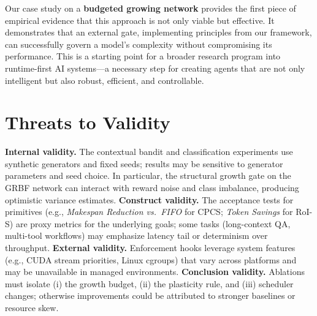 \documentclass[
]{article}
\begin{document}
Our case study on a \textbf{budgeted growing network} provides the first
piece of empirical evidence that this approach is not only viable but
effective. It demonstrates that an external gate, implementing
principles from our framework, can successfully govern a model's
complexity without compromising its performance. This is a starting
point for a broader research program into runtime-first AI systems---a
necessary step for creating agents that are not only intelligent but
also robust, efficient, and controllable.


\section*{Threats to Validity}
\textbf{Internal validity.} The contextual bandit and classification experiments use synthetic generators and fixed seeds; results may be sensitive to generator parameters and seed choice. In particular, the structural growth gate on the GRBF network can interact with reward noise and class imbalance, producing optimistic variance estimates. \textbf{Construct validity.} The acceptance tests for primitives (e.g., \emph{Makespan Reduction vs.\ FIFO} for CPCS; \emph{Token Savings} for RoI-S) are proxy metrics for the underlying goals; some tasks (long-context QA, multi-tool workflows) may emphasize latency tail or determinism over throughput. \textbf{External validity.} Enforcement hooks leverage system features (e.g., CUDA stream priorities, Linux cgroups) that vary across platforms and may be unavailable in managed environments. \textbf{Conclusion validity.} Ablations must isolate (i) the growth budget, (ii) the plasticity rule, and (iii) scheduler changes; otherwise improvements could be attributed to stronger baselines or resource skew.
\end{document}

